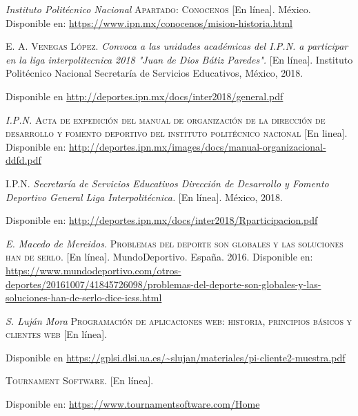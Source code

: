 \begin{thebibliography}{}
	\textit{Instituto Politécnico Nacional}
	\textsc{Apartado: Conocenos} [En línea]. México.
	Disponible en: 
	\url{https://www.ipn.mx/conocenos/mision-historia.html}
	
	\textsc{E. A. Venegas López.}
	\textit{Convoca a las unidades académicas del I.P.N. a participar en la liga interpolitecnica 2018 "Juan de Dios Bátiz Paredes".} [En línea]. Instituto Politécnico Nacional Secretaría de Servicios Educativos, México, 2018.
	
	Disponible en
	\url{http://deportes.ipn.mx/docs/inter2018/general.pdf}
	
	\textit{I.P.N.}
	\textsc{Acta de expedición del manual de organización de la dirección de desarrollo y fomento deportivo del instituto politécnico nacional} [En linea].
	Disponible en:
	\url{http://deportes.ipn.mx/images/docs/manual-organizacional-ddfd.pdf}
	
	\textsc{I.P.N.}
	\textit{Secretaría de Servicios Educativos Dirección de Desarrollo y Fomento Deportivo General Liga Interpolitécnica.}
	[En línea]. México, 2018.
	
	Disponible en: 
	\url{http://deportes.ipn.mx/docs/inter2018/Rparticipacion.pdf}
	
	\textit{E. Macedo de Mereidos.}
	\textsc{Problemas del deporte son globales y las soluciones han de serlo.} [En línea]. 
	MundoDeportivo. España. 2016.
	Disponible en: 
	\url{https://www.mundodeportivo.com/otros-deportes/20161007/41845726098/problemas-del-deporte-son-globales-y-las-soluciones-han-de-serlo-dice-icss.html}
	
	\textit{S. Luján Mora}
	\textsc{Programación de aplicaciones web: historia, principios básicos y clientes web} [En línea].
	
	Disponible en 
	\url{https://gplsi.dlsi.ua.es/~slujan/materiales/pi-cliente2-muestra.pdf}
	
	\textit{}
	\textsc{Tournament Software.} [En línea].
	
	Disponible en: 
	\url{https://www.tournamentsoftware.com/Home}
	

\end{thebibliography}
